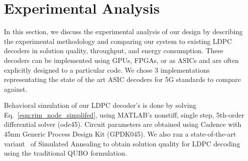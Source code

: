 \section{Experimental Analysis}
\label{sec:evaluations}

In this section, we discuss the experimental analysis of our design by describing the experimental methodology and comparing our system to existing LDPC decoders in solution quality, throughput, and energy consumption. 
These decoders can be implemented using GPUs, FPGAs, or as ASICs and are often 
explicitly designed to a particular code. We chose 3 implementations representating 
the state of the art ASIC decoders for 5G standards to compare against.

Behavioral simulation of our LDPC decoder's is done by solving Eq.~\ref{eqn:rim_node_simplifed}, 
using MATLAB's nonstiff, single step, 5th-order differential solver (ode45). Circuit parameters are 
obtained using Cadence with 45nm Generic Process Design Kit (GPDK045). 
We also ran a state-of-the-art variant~\cite{Isakov}  of 
Simulated Annealing to obtain solution quality for LDPC decoding using the traditional
QUBO formulation.




